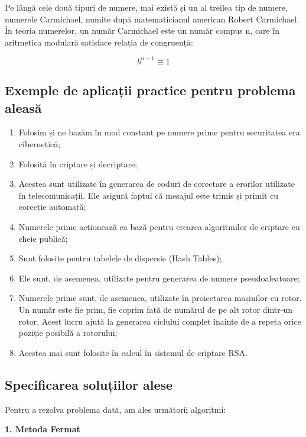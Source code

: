 \documentclass[runningheads]{llncs}
\begin{document}
Pe lângă cele două tipuri de numere, mai există și un al treilea tip de numere, numerele Carmichael, numite după matematicianul
american Robert Carmichael. În teoria numerelor, un număr Carmichael este un număr compus n, care în aritmetica modulară
satisface relația de congruență: 

\begin{equation*}
    b^{n - 1} \equiv 1
\end{equation*}

\subsection{Exemple de aplicații practice pentru problema aleasă}

\begin{enumerate}
    \item Folosim și ne bazăm în mod constant pe numere prime pentru securitatea era cibernetică;
    \item Folosită în criptare și decriptare;
    \item Acestea sunt utilizate în generarea de coduri de corectare a erorilor utilizate în telecomunicații. Ele asigură faptul că mesajul este trimis și primit cu corecție automată;
    \item Numerele prime acționează ca bază pentru crearea algoritmilor de criptare cu cheie publică;
    \item Sunt folosite pentru tabelele de dispersie (Hash Tables);
    \item Ele sunt, de asemenea, utilizate pentru generarea de numere pseudoaleatoare;
    \item Numerele prime sunt, de asemenea, utilizate în proiectarea mașinilor cu rotor. Un număr este fie prim, fie coprim față de numărul de pe alt rotor dintr-un rotor. Acest lucru ajută la generarea ciclului complet înainte de a repeta orice poziție posibilă a rotorului;
    \item Acestea mai sunt folosite în calcul în sistemul de criptare RSA.
\end{enumerate}

\subsection{Specificarea soluțiilor alese}

Pentru a rezolva problema dată, am ales următorii algoritmi:

\textbf{1. Metoda Fermat} \newline
\end{document}
